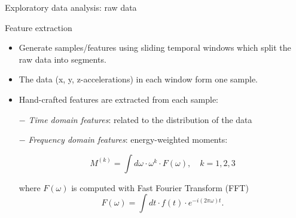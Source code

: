 \documentclass{if-beamer}
\begin{document}
\begin{frame}{Exploratory data analysis: raw data}


        \begin{block}{Feature extraction}
        
        \begin{itemize}
               \item  Generate samples/features using sliding temporal windows which split the raw data into segments. 
                
                \item The data (x, y, z-accelerations) in each window form one sample.  
         
             \item Hand-crafted features are extracted from each sample:
        \end{itemize}
        
        \begin{enumerate}
        		\item[$-$] \emph{Time domain features}: related to the distribution of the data
		
                                            
                                            
 		\item[$-$]  \emph{Frequency domain features}:  energy-weighted moments:
			  
                            \begin{equation}
                            		M^{(k)} = \int d\omega \cdot \omega^k \cdot F(\omega),\quad k=1, 2, 3
                            \end{equation}
                            
                             where $F(\omega)$ is computed with Fast Fourier Transform (FFT)
                              \begin{equation}
                              		F(\omega) = \int dt \cdot f(t) \cdot e^{-i(2\pi\omega) t}.
                                \end{equation}


               \end{enumerate}
   	 \end{block}
	 
\end{frame}
\end{document}
